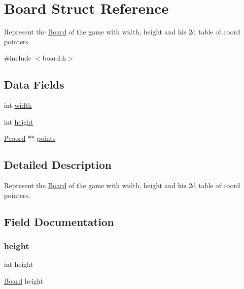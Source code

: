 \hypertarget{struct_board}{}\section{Board Struct Reference}
\label{struct_board}


Represent the \hyperlink{struct_board}{Board} of the game with width, height and his 2d table of coord pointers.  




{\ttfamily \#include $<$board.\+h$>$}

\subsection*{Data Fields}
\begin{DoxyCompactItemize}
\item 
int \hyperlink{struct_board_a2474a5474cbff19523a51eb1de01cda4}{width}
\item 
int \hyperlink{struct_board_ad12fc34ce789bce6c8a05d8a17138534}{height}
\item 
\hyperlink{board_8h_ab8cc720589a392832ddcc5e65efcbb47}{Pcoord} $\ast$$\ast$ \hyperlink{struct_board_a8c2f9ff4e64bb7766dbb8623d7326433}{points}
\end{DoxyCompactItemize}


\subsection{Detailed Description}
Represent the \hyperlink{struct_board}{Board} of the game with width, height and his 2d table of coord pointers. 

\subsection{Field Documentation}
\mbox{\label{struct_board_ad12fc34ce789bce6c8a05d8a17138534}} 
\subsubsection{\texorpdfstring{height}{height}}
{\footnotesize\ttfamily int height}

\hyperlink{struct_board}{Board} height \mbox{\label{struct_board_a8c2f9ff4e64bb7766dbb8623d7326433}} 
